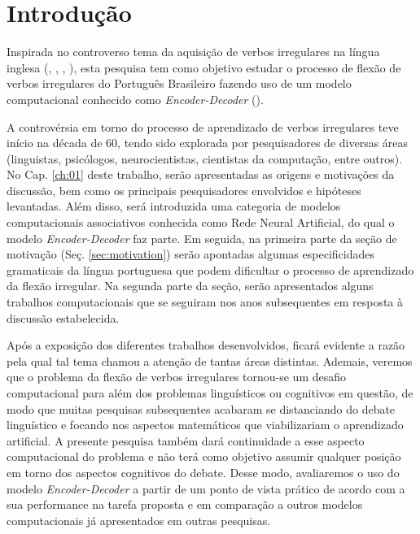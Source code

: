 \chapter*{Introdução}

Inspirada no controverso tema da aquisição de verbos irregulares na língua inglesa
(\cite{Pinker:1999}, \cite{chomsky:1968},  \cite{Pinker:1988}, \cite{rumelhart:1986}), esta pesquisa tem como objetivo estudar o processo de flexão de verbos irregulares do Português Brasileiro fazendo uso de um modelo computacional conhecido como \textit{Encoder-Decoder} (\cite{enc-dec:2014}).

A controvérsia em torno do processo de aprendizado de verbos irregulares teve início na década de 60, tendo sido explorada por pesquisadores de diversas áreas (linguistas, psicólogos, neurocientistas, cientistas da computação, entre outros). No Cap. \ref{ch:01} deste trabalho, serão apresentadas as origens e motivações da discussão, bem como os principais pesquisadores envolvidos e hipóteses levantadas. Além disso, será introduzida uma categoria de modelos computacionais associativos conhecida como Rede Neural Artificial, do qual o modelo \textit{Encoder-Decoder} faz parte. Em seguida, na primeira parte da seção de motivação (Seç. \ref{sec:motivation}) serão apontadas algumas especificidades gramaticais da língua portuguesa que podem dificultar o processo de aprendizado da flexão irregular. Na segunda parte da seção, serão apresentados alguns trabalhos computacionais que se seguiram nos anos subsequentes em resposta à discussão estabelecida. 

Após a exposição dos diferentes trabalhos desenvolvidos, ficará evidente a razão pela qual tal tema chamou a atenção de tantas áreas distintas. Ademais, veremos que o problema da flexão de verbos irregulares tornou-se um desafio computacional para além dos problemas linguísticos ou cognitivos em questão, de modo que muitas pesquisas subsequentes acabaram se distanciando do debate linguístico e focando nos aspectos matemáticos que viabilizariam o aprendizado artificial. A presente pesquisa também dará continuidade a esse aspecto computacional do problema e não terá como objetivo assumir qualquer posição em torno dos aspectos cognitivos do debate. Desse modo, avaliaremos o uso do modelo \textit{Encoder-Decoder} a partir de um ponto de vista prático de acordo com a sua performance na tarefa proposta e em comparação a outros modelos computacionais já apresentados em outras pesquisas.

